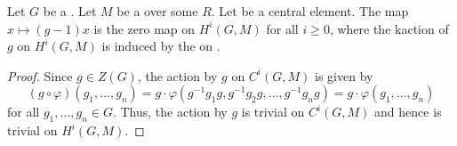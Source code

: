 \begin{lemma} \label{lemma:sahs_lemma_central_element_of_a_group_acts_trivially_on_first_cohomology_on_a_module}
    Let $G$ be a . Let $M$ be a  over some  $R$. Let  be a central element.
    The map $x \mapsto (g-1) x$ is the zero map on $H^i(G,M)$ for all $i \geq 0$, where the kaction of $g$ on $H^i(G,M)$ is induced by the  on . 
\end{lemma}
\begin{proof}
    Since $g \in Z(G)$, the action by $g$ on $C^i(G,M)$ is given by 
    $$(g \circ \varphi)(g_1,\ldots,g_n) = g \cdot \varphi(g^{-1} g_1 g, g^{-1} g_2 g, \ldots, g^{-1} g_n g) = g \cdot \varphi(g_1,\ldots,g_n)$$
    for all $g_1,\ldots,g_n \in G$. Thus, the action by $g$ is trivial on $C^i(G,M)$ and hence is trivial on $H^i(G,M)$.
\end{proof}